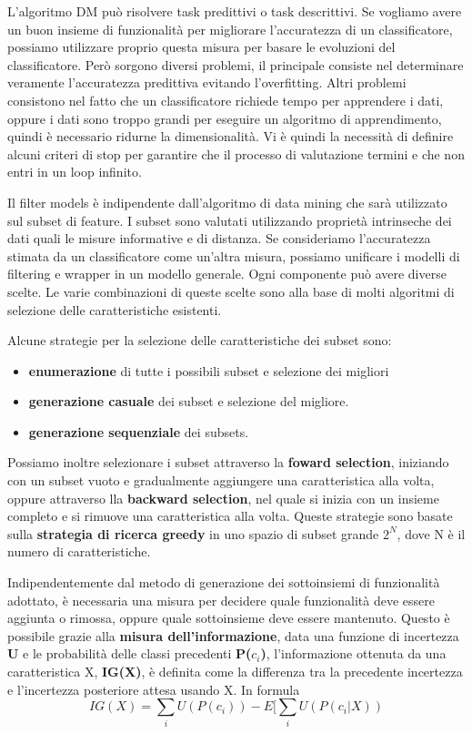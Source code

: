 \documentclass[a4paper]{extarticle}
\begin{document}
L'algoritmo DM può risolvere task predittivi o task descrittivi. Se vogliamo avere un buon insieme di funzionalità per migliorare l'accuratezza di un classificatore, possiamo utilizzare proprio questa misura per basare le evoluzioni del classificatore. Però sorgono diversi problemi, il principale consiste nel determinare veramente l'accuratezza predittiva evitando l'overfitting. Altri problemi consistono nel fatto che un classificatore richiede tempo per apprendere i dati, oppure i dati sono troppo grandi per eseguire un algoritmo di apprendimento, quindi è necessario ridurne la dimensionalità. Vi è quindi la necessità di definire alcuni criteri di stop per garantire che il processo di valutazione termini e che non entri in un loop infinito.

Il filter models è indipendente dall'algoritmo di data mining che sarà utilizzato sul subset di feature. I subset sono valutati utilizzando proprietà intrinseche dei dati quali le misure informative e di distanza. Se consideriamo l'accuratezza stimata da un classificatore come un'altra misura, possiamo unificare i modelli di filtering e wrapper in un modello generale. Ogni componente può avere diverse scelte. Le varie combinazioni di queste scelte sono alla base di molti algoritmi di selezione delle caratteristiche esistenti.

Alcune strategie per la selezione delle caratteristiche dei subset sono:
\begin{itemize}
\item \textbf{enumerazione} di tutte i possibili subset e selezione dei migliori
\item \textbf{generazione casuale} dei subset e selezione del migliore.
\item \textbf{generazione sequenziale} dei subsets.
\end{itemize}

Possiamo inoltre selezionare i subset attraverso la \textbf{foward selection}, iniziando con un subset vuoto e gradualmente aggiungere una caratteristica alla volta, oppure attraverso lla \textbf{backward selection}, nel quale si inizia con un insieme completo e si rimuove una caratteristica alla volta. Queste strategie sono basate sulla \textbf{strategia di ricerca greedy} in uno spazio di subset grande $2^N$, dove N è il numero di caratteristiche.

Indipendentemente dal metodo di generazione dei sottoinsiemi di funzionalità adottato, è necessaria una misura per decidere quale funzionalità deve essere aggiunta o rimossa, oppure quale sottoinsieme deve essere mantenuto. Questo è possibile grazie alla \textbf{misura dell'informazione}, data una funzione di incertezza \textbf{U} e le probabilità delle classi precedenti \textbf{P($c_i$)}, l'informazione ottenuta da una caratteristica X, \textbf{IG(X)}, è definita come la differenza tra la precedente incertezza e l'incertezza posteriore attesa usando X. In formula
\begin{equation}
IG(X)= \sum_{i} U(P(c_i))-E[\sum_{i}U(P(c_i|X))
\end{equation}
\end{document}
